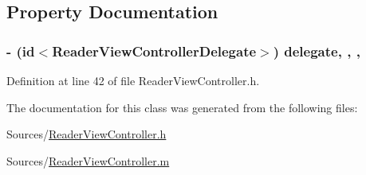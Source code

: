 \subsection{Property Documentation}
\hypertarget{interface_reader_view_controller_ab90e46fc4dbc3417344a6ac78b1516fc}{
\subsubsection[{delegate}]{\setlength{\rightskip}{0pt plus 5cm}-\/ (id$<${\bf Reader\-View\-Controller\-Delegate}$>$) delegate\hspace{0.3cm}{\ttfamily [read]}, {\ttfamily [write]}, {\ttfamily [nonatomic]}, {}}}\label{d5/dfd/interface_reader_view_controller_ab90e46fc4dbc3417344a6ac78b1516fc}


Definition at line 42 of file Reader\-View\-Controller.\-h.



The documentation for this class was generated from the following files\-:\begin{DoxyCompactItemize}
\item 
Sources/\hyperlink{_reader_view_controller_8h}{Reader\-View\-Controller.\-h}\item 
Sources/\hyperlink{_reader_view_controller_8m}{Reader\-View\-Controller.\-m}\end{DoxyCompactItemize}
